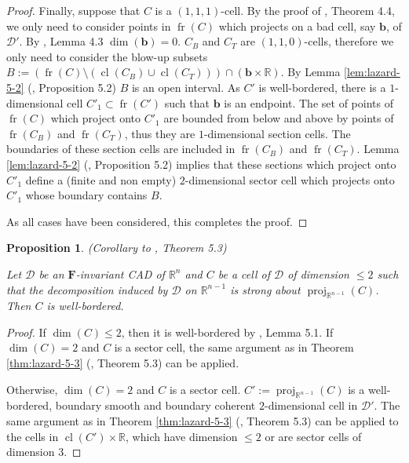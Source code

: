 \documentclass[
]{book}
\newtheorem{proposition}{Proposition}[chapter]
\theoremstyle{definition}
\theoremstyle{definition}
\theoremstyle{definition}
\theoremstyle{definition}
\theoremstyle{remark}
\begin{document}
\begin{proof}
Finally, suppose that \(C\) is a \((1,1,1)\)-cell.
By the proof of \citet{lazard10}, Theorem 4.4, we only need to consider points in \({\operatorname{fr} \left( C \right)}\) which projects on a bad cell, say \(\mathbf{b}\), of \(\mathcal{D'}\).
By \citet{lazard10}, Lemma 4.3 \(\dim(\mathbf{b}) = 0\).
\(C_B\) and \(C_T\) are \((1,1,0)\)-cells, therefore we only need to consider the blow-up subsets \(B := ({\operatorname{fr} \left( C \right)} \setminus ({\operatorname{cl} \left( C_B \right)} \cup {\operatorname{cl} \left( C_T \right)})) \cap (\mathbf{b} \times \mathbb{R})\). By Lemma \ref{lem:lazard-5-2} (\citet{lazard10}, Proposition 5.2) \(B\) is an open interval.
As \(C'\) is well-bordered, there is a \(1\)-dimensional cell \(C'_1 \subset {\operatorname{fr} \left( C' \right)}\) such that \(\mathbf{b}\) is an endpoint.
The set of points of \({\operatorname{fr} \left( C \right)}\) which project onto \(C'_1\) are bounded from below and above by points of \({\operatorname{fr} \left( C_B \right)}\) and \({\operatorname{fr} \left( C_T \right)}\), thus they are \(1\)-dimensional section cells. The boundaries of these section cells are included in \({\operatorname{fr} \left( C_B \right)}\) and \({\operatorname{fr} \left( C_T \right)}\).
Lemma \ref{lem:lazard-5-2} (\citet{lazard10}, Proposition 5.2) implies that these sections which project onto \(C'_1\) define a (finite and non empty) \(2\)-dimensional sector cell which projects onto \(C'_1\) whose boundary
contains \(B\).

As all cases have been considered, this completes the proof.
\end{proof}

\begin{proposition}
\protect\hypertarget{prp:ext-lazard-5-3}{}\label{prp:ext-lazard-5-3}(Corollary to \citet{lazard10}, Theorem 5.3)

Let \(\mathcal{D}\) be an \(\mathbf{F}\)-invariant CAD of \(\mathbb{R}^n\) and \(C\) be a cell of \(\mathcal{D}\) of dimension \(\le 2\) such that the decomposition induced by \(\mathcal{D}\) on \(\mathbb{R}^{n-1}\) is strong about \({\operatorname{proj}_{\mathbb{R}^{n-1}}}(C)\). Then \(C\) is well-bordered.
\end{proposition}

\begin{proof}
If \(\dim(C) \le 2\), then it is well-bordered by \citet{lazard10}, Lemma 5.1.
If \(\dim(C) = 2\) and \(C\) is a sector cell, the same argument as in Theorem \ref{thm:lazard-5-3} (\citet{lazard10}, Theorem 5.3) can be applied.

Otherwise, \(\dim(C) = 2\) and \(C\) is a sector cell. \(C' := {\operatorname{proj}_{\mathbb{R}^{n-1}}}(C)\) is a well-bordered, boundary smooth and boundary coherent \(2\)-dimensional cell in \(\mathcal{D'}\). The same argument as in Theorem \ref{thm:lazard-5-3} (\citet{lazard10}, Theorem 5.3) can be applied to the cells in \({\operatorname{cl} \left( C' \right)} \times \mathbb{R}\), which have dimension \(\le 2\) or are sector cells of dimension \(3\).
\end{proof}
\end{document}
